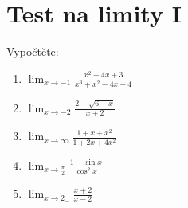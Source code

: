 \documentclass[12pt,a4paper]{article}
\begin{document}
\section*{Test na limity I}

Vypočtěte:

\begin{enumerate}
	\everymath{\displaystyle}
	\parskip\bigskipamount
	\item $\lim_{x \to -1} \frac{x^2 + 4x + 3}{x^3 + x^2 - 4x - 4}$
	\item $\lim_{x \to -2} \frac{2 - \sqrt{6+x}}{x+2}$
	\item $\lim_{x \to \infty} \frac{1 + x + x^2}{1 + 2x + 4x^2}$
	\item $\lim_{x \to \frac\pi2} \frac{1-\sin x}{\cos^2 x}$
	\item $\lim_{x\to 2_-} \frac{x+2}{x-2}$
\end{enumerate}
\end{document}
